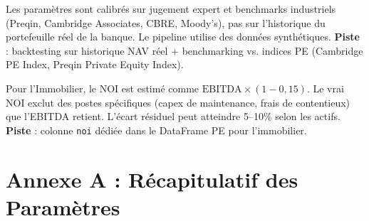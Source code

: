 \documentclass[12pt,a4paper]{article}
\begin{document}
\begin{warningbox}
Les param\`{e}tres sont calibr\'{e}s sur jugement expert et benchmarks industriels
(Preqin, Cambridge Associates, CBRE, Moody's), pas sur l'historique du portefeuille
r\'{e}el de la banque. Le pipeline utilise des donn\'{e}es synth\'{e}tiques.
\textbf{Piste} : backtesting sur historique NAV r\'{e}el + benchmarking vs. indices PE
(Cambridge PE Index, Preqin Private Equity Index).
\end{warningbox}

\begin{warningbox}
Pour l'Immobilier, le NOI est estim\'{e} comme $\mathrm{EBITDA} \times (1 - 0{,}15)$.
Le vrai NOI exclut des postes sp\'{e}cifiques (capex de maintenance, frais de contentieux)
que l'EBITDA retient. L'\'{e}cart r\'{e}siduel peut atteindre 5--10\% selon les actifs.
\textbf{Piste} : colonne \texttt{noi} d\'{e}di\'{e}e dans le DataFrame PE pour l'immobilier.
\end{warningbox}


\section{Annexe A : R\'{e}capitulatif des Param\`{e}tres}
\label{sec:annexe}
\end{document}
